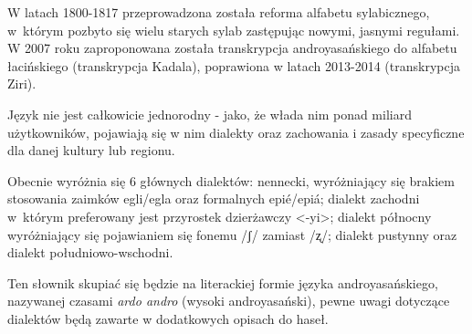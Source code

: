 W latach 1800-1817 przeprowadzona została reforma alfabetu sylabicznego, 
w~którym pozbyto się wielu starych sylab zastępując nowymi, jasnymi regułami. 
W 2007 roku zaproponowana została transkrypcja androyasańskiego do alfabetu 
łacińskiego (transkrypcja Kadala), poprawiona w latach 2013-2014 (transkrypcja 
Ziri).

Język nie jest całkowicie jednorodny - jako, że włada nim ponad miliard 
użytkowników, pojawiają się w nim dialekty oraz zachowania i zasady specyficzne 
dla danej kultury lub regionu. 

Obecnie wyróżnia się 6 głównych dialektów: nennecki, wyróżniający się brakiem 
stosowania zaimków egli/egla oraz formalnych epié/epiá; dialekt zachodni 
w~którym preferowany jest przyrostek dzierżawczy <-yi>; dialekt północny 
wyróżniający się pojawianiem się fonemu /ʃ/ zamiast /ʐ/; dialekt pustynny
oraz dialekt południowo-wschodni.

Ten słownik skupiać się będzie na literackiej formie języka androyasańskiego, 
nazywanej czasami \emph{ardo andro} (wysoki androyasański), pewne uwagi 
dotyczące dialektów będą zawarte w dodatkowych opisach do haseł.
